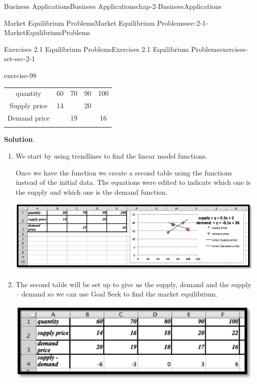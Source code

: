 \documentclass[oneside,10pt,]{book}
\numberwithin{equation}{section}
\newcommand{\hrulethin}  {\noalign{\hrule height 0.04em}}
\newcommand{\hrulemedium}{\noalign{\hrule height 0.07em}}
\begin{document}
\begin{chapterptx}{Business Applications}{}{Business Applications}{}{}{chap-2-BusinessApplications}
\begin{sectionptx}{Market Equilibrium Problems}{}{Market Equilibrium Problems}{}{}{sec-2-1-MarketEquilibriumProblems}
\begin{exercises-subsection-numberless}{Exercises 2.1 Equilibrium Problems}{}{Exercises 2.1 Equilibrium Problems}{}{}{exercises-set-sec-2-1}
\begin{exercisegroup}
\begin{divisionexerciseeg}{7}{}{}{exercise-98}
\begin{sidebyside}{1}{0}{0}{0}
\begin{sbspanel}{1}
{\begin{tabular}{ccccc}
quantity&60&70&90&100\tabularnewline\hrulethin
Supply price&14&&20&\tabularnewline\hrulemedium
Demand price&&19&&16\tabularnewline\hrulemedium
\end{tabular}
\par}
\end{sbspanel}%
\end{sidebyside}%
\par\smallskip%
\noindent\textbf{Solution}.\hypertarget{solution-47}{}\quad%
\leavevmode%
\begin{enumerate}[label=(\alph*)]
\item\hypertarget{li-172}{}\hypertarget{p-610}{}%
We start by using trendlines to find the linear model functions.%
\par
\hypertarget{p-611}{}%
Once we have the function we create a second table using the functions instead of the initial data. The equations were edited to indicate which one is the supply and which one is the demand function.%
\begin{sidebyside}{1}{0.05}{0.05}{0}%
\begin{sbspanel}{0.9}%
\includegraphics[width=1\linewidth]{images/sec2-1-sol7a.png}
\end{sbspanel}%
\end{sidebyside}%
\item\hypertarget{li-173}{}\hypertarget{p-612}{}%
The second table will be set up to give us the supply, demand and the supply – demand so we can use Goal Seek to find the market equilibrium. \leavevmode%
\begin{sidebyside}{1}{0.2}{0.2}{0}%
\begin{sbspanel}{0.6}%
\includegraphics[width=1\linewidth]{images/sec2-1-sol7b.png}
\end{sbspanel}%

\end{sidebyside}
\end{enumerate}
\end{divisionexerciseeg}
\end{exercisegroup}
\end{exercises-subsection-numberless}
\end{sectionptx}
\end{chapterptx}
\end{document}

